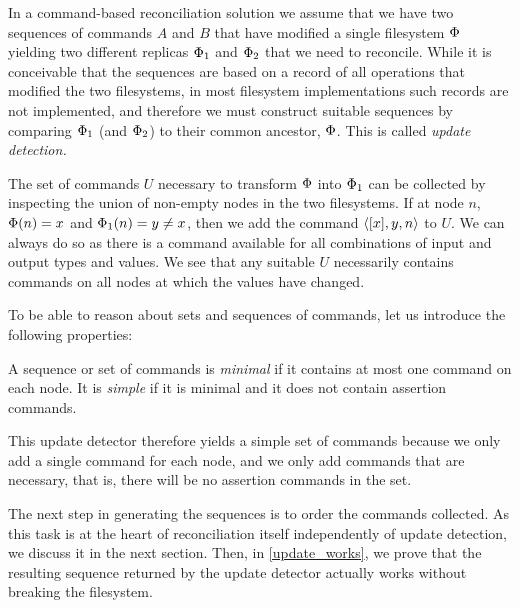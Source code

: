 
In a command-based reconciliation solution we assume that we have two sequences of commands
$A$ and $B$ that have modified a single filesystem $\Phi$ 
yielding two different replicas $\Phi_1$ and $\Phi_2$ that we
need to reconcile. While it is conceivable that the sequences are based on a record of
all operations that modified the two filesystems, in most filesystem implementations
such records are not implemented, and therefore we must construct suitable sequences
by comparing $\Phi_1$ (and $\Phi_2$) to their common ancestor, $\Phi$. 
This is called \emph{update detection.}

The set of commands $U$ necessary to transform $\Phi$ into $\Phi_1$ can be collected
by inspecting the union of non-empty nodes in the two filesystems.
If at node $n$, $\Phi(n)=x$ and $\Phi_1(n)=y\neq x$, then we add the command $\langle{[x],y,n}\rangle$ to $U$.
We can always do so as there is a command available for all combinations of input and output types and values.
We see that any suitable $U$ necessarily contains commands on all nodes at which the values have changed.


To be able to reason about sets and sequences of commands, let us introduce the following properties:


\begin{mydef}
A sequence or set of commands is \emph{minimal} if it contains at most one command on each node.
It is \emph{simple} if it is minimal and it does not contain assertion commands.
\end{mydef}

This update detector therefore yields a simple set of commands because we only add a single command
for each node, and we only add commands that are necessary, that is, there will be no 
assertion commands in the set.

The next step in generating the sequences is to order the commands collected.
As this task is at the heart of reconciliation itself independently of update detection,
we discuss it in the next section.
Then, in \cref{update_works}, we prove that the resulting sequence 
returned by the update detector actually works without breaking the filesystem.

